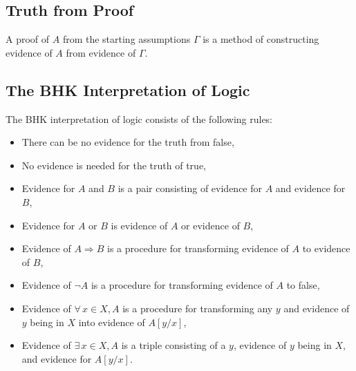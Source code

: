 \subsection{Truth from Proof}

A proof of $A$ from the starting assumptions $\Gamma$ is a method
of constructing evidence of $A$ from evidence of $\Gamma$.

\subsection{The BHK Interpretation of Logic}

The BHK interpretation of logic consists of the following rules:
\begin{itemize}
    \item There can be no evidence for the truth from false,
    \item No evidence is needed for the truth of true,
    \item Evidence for $A$ and $B$ is a pair consisting of evidence
        for $A$ and evidence for $B$,
    \item Evidence for $A$ or $B$ is evidence of $A$ or evidence of $B$,
    \item Evidence of $A \Rightarrow B$ is a procedure for transforming
        evidence of $A$ to evidence of $B$,
    \item Evidence of $\neg A$ is a procedure for transforming evidence
        of $A$ to false,
    \item Evidence of $\forall \, x \in X, A$ is a procedure for transforming
        any $y$ and evidence of $y$ being in $X$ into evidence of $A[y / x]$,
    \item Evidence of $\exists \, x \in X, A$ is a triple consisting of a
        $y$, evidence of $y$ being in $X$, and evidence for $A[y / x]$.
\end{itemize}
